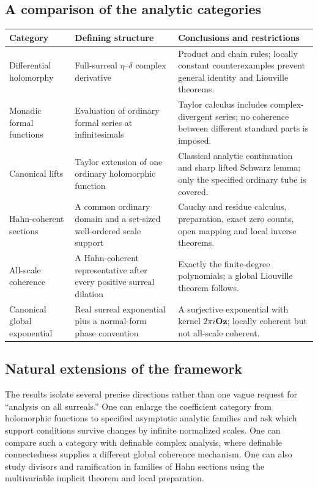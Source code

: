 \documentclass[11pt,oneside]{article}
\numberwithin{equation}{section}
\theoremstyle{definition}
\theoremstyle{remark}\newtheorem{remark}[theorem]{Remark}
\newcommand{\Oz}{\mathbf{Oz}}
\begin{document}
\subsection{A comparison of the analytic categories}
\begin{longtable}{>{\raggedright\arraybackslash}p{}>{\raggedright\arraybackslash}p{}>{\raggedright\arraybackslash}p{}}
\toprule
\textbf{Category} & \textbf{Defining structure} & \textbf{Conclusions and restrictions}\\
\midrule
\endhead
Differential holomorphy & Full-surreal $\eta$--$\delta$ complex derivative &
Product and chain rules; locally constant counterexamples prevent general
identity and Liouville theorems.\\[4pt]
Monadic formal functions & Evaluation of ordinary formal series at
infinitesimals & Taylor calculus includes complex-divergent series;
no coherence between different standard parts is imposed.\\[4pt]
Canonical lifts & Taylor extension of one ordinary holomorphic function &
Classical analytic continuation and sharp lifted Schwarz lemma;
only the specified ordinary tube is covered.\\[4pt]
Hahn-coherent sections & A common ordinary domain and a set-sized
well-ordered scale support & Cauchy and residue calculus, preparation,
exact zero counts, open mapping and local inverse theorems.\\[4pt]
All-scale coherence & A Hahn-coherent representative after every positive
surreal dilation & Exactly the finite-degree polynomials; a global
Liouville theorem follows.\\[4pt]
Canonical global exponential & Real surreal exponential plus a normal-form
phase convention & A surjective exponential with kernel $2\pi i\Oz$;
locally coherent but not all-scale coherent.\\
\bottomrule
\end{longtable}

\subsection{Natural extensions of the framework}
The results isolate several precise directions rather than one vague
request for ``analysis on all surreals.'' One can enlarge the coefficient
category from holomorphic functions to specified asymptotic analytic
families and ask which support conditions survive changes by infinite
normalized scales. One can compare such a category with definable complex
analysis, where definable connectedness supplies a different global
coherence mechanism. One can also study divisors and ramification in
families of Hahn sections using the multivariable implicit theorem and
local preparation.
\end{document}

